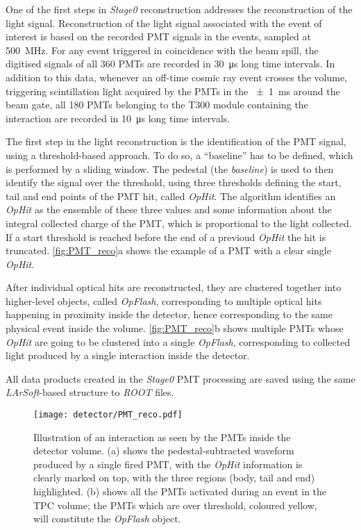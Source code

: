 One of the first steps in \emph{Stage0} reconstruction addresses the reconstruction of the light signal. Reconstruction of the light signal associated with the event of interest is based on the recorded PMT signals in the events, sampled at \SI{500}{\mega\hertz}. For any event triggered in coincidence with the beam spill, the digitised signals of all 360 PMTs are recorded in \SI{30}{\us} long time intervals. In addition to this data, whenever an off-time cosmic ray event crosses the volume, triggering scintillation light acquired by the PMTs in the \SI{+-1}{\ms} around the beam gate, all 180 PMTs belonging to the T300 module containing the interaction are recorded in \SI{10}{\us} long time intervals. 

The first step in the light reconstruction is the identification of the PMT signal, using a threshold-based approach. To do so, a ``baseline'' has to be defined, which is performed by a sliding window. The pedestal (the \emph{baseline}) is used to then identify the signal over the threshold, using three thresholds defining the start, tail and end points of the PMT hit, called \emph{OpHit}. The algorithm identifies an \emph{OpHit} as the ensemble of these three values and some information about the integral collected charge of the PMT, which is proportional to the light collected. If a start threshold is reached before the end of a previoud \emph{OpHit} the hit is truncated. \autoref{fig:PMT_reco}a shows the example of a PMT with a clear single \emph{OpHit}. 

After individual optical hits are reconstructed, they are clustered together into higher-level objects, called \emph{OpFlash}, corresponding to multiple optical hits happening in proximity inside the detector, hence corresponding to the same physical event inside the volume. \autoref{fig:PMT_reco}b shows multiple PMTs whose \emph{OpHit} are going to be clustered into a single \emph{OpFlash}, corresponding to collected light produced by a single interaction inside the detector. 

All data products created in the \emph{Stage0} PMT processing are saved using the same \emph{LArSoft}-based structure to \emph{ROOT} \cite{rene_brun_2019_3895860} files. 

\begin{figure}
    \centering
    \texttt{[image: detector/PMT\_reco.pdf]}
    \caption[PMT reconstructed \emph{OpHits}]{Illustration of an interaction as seen by the PMTs inside the detector volume. (a) shows the pedestal-subtracted waveform produced by a single fired PMT, with the \emph{OpHit} information is clearly marked on top, with the three regions (body, tail and end) highlighted. (b) shows all the PMTs activated during an event in the TPC volume; the PMTs which are over threshold, coloured yellow, will constitute the \emph{OpFlash} object.}
    \label{fig:PMT_reco}
\end{figure}

